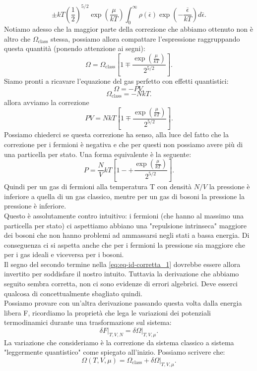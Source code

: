 \[
	\pm kT \left( \frac{1}{2} \right) ^{5 /2} \exp\left( \frac{\mu }{kT} \right) \int_{0}^{\infty} \rho ( \overline{\epsilon }) \exp\left( - \frac{\overline{\epsilon }}{kT} \right) d \overline{\epsilon } 
.\] 
Notiamo adesso che la maggior parte della correzione che abbiamo ottenuto non è altro che $\Omega _{\text{class}}$ stessa, possiamo allora compattare l'espressione raggruppando questa quantità (ponendo attenzione ai segni):
\[
	\Omega = \Omega _{\text{class}} \left[ 1 \mp \frac{\exp\left( \frac{\mu }{kT} \right) }{2^{5 /2}} \right] 
.\] 
Siamo pronti a ricavare l'equazione del gas perfetto con effetti quantistici:
\[
	\Omega  = - PV
.\]  
\[
	\Omega _{\text{class}} = -NkT
.\]
allora avviamo la correzione
\[
	PV = NkT\left[ 1 \mp \frac{\exp\left( \frac{\mu }{kT} \right) }{2^{5 /2}} \right] \label{eq:eq-id-corretta_1}
.\] 
Possiamo chiederci se questa correzione ha senso, alla luce del fatto che la correzione per i fermioni è negativa e che per questi non possiamo avere più di una particella per stato. Una forma equivalente è la seguente:
\[
	P = \frac{N}{V} kT \left[ 1 -+ \frac{\exp\left( \frac{\mu }{kT} \right) }{2^{ 5 /2}} \right] 
.\] 
Quindi per un gas di fermioni alla temperatura T con densità $N /V$ la pressione è inferiore a quella di un gas classico, mentre per un gas di bosoni la pressione la pressione è inferiore. \\
Questo è assolutamente contro intuitivo: i fermioni (che hanno al massimo una particella per stato) ci aspettiamo abbiano una "repulsione intrinseca" maggiore dei bosoni che non hanno problemi ad ammassarsi negli stati a bassa energia. Di conseguenza ci si aspetta anche che per i fermioni la pressione sia maggiore che per i gas ideali e viceversa per i bosoni. \\
Il segno del secondo termine nella \ref{eq:eq-id-corretta_1} dovrebbe essere allora invertito per soddisfare il nostro intuito. Tuttavia la derivazione che abbiamo seguito sembra corretta, non ci sono evidenze di errori algebrici. Deve esserci qualcosa di concettualmente sbagliato quindi.\\
Possiamo provare con un'altra derivazione passando questa volta dalla energia libera F, ricordiamo la proprietà che lega le variazioni dei potenziali termodinamici durante una trasformazione sul sistema:
\[
	\left.\delta F\right|_{T,V,N} = \left.\delta \Omega \right|_{T,V,\mu }
.\]
La variazione che consideriamo è la correzione da sistema classico a sistema "leggermente quantistico" come spiegato all'inizio.
Possiamo scrivere che:
\[
	\Omega ( T,V,\mu )  = \Omega _{\text{class}} + \delta \left.\Omega \right|_{T,V,\mu }
.\] 
